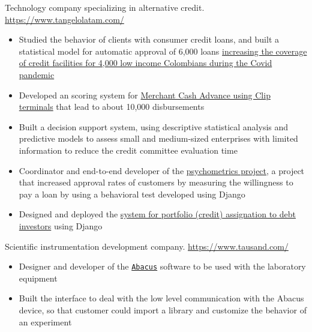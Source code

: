 \documentclass[11pt, letterpaper, sans]{moderncv}
\begin{document}
    {
        Technology company specializing in alternative credit. \url{https://www.tangelolatam.com/}
        \vspace{3pt}
        \begin{itemize}
            \item Studied the behavior of clients with consumer credit loans, and built a statistical model for automatic approval of 6,000 loans \href{https://forbes.co/2020/05/13/emprendedores/zinobe-obtiene-us30-millones-en-financiacion-para-otorgar-mas-creditos-digitales}{\color{color1} increasing the coverage of credit facilities for 4,000 low income Colombians during the Covid pandemic}
            \item Developed an scoring system for \href{https://tekiosmag.com/2022/03/31/fintech-tangelo-anuncia-alianza-con-el-unicornio-mexicano-clip-y-dell-leasing/}{\color{color1} Merchant Cash Advance using Clip terminals} that lead to about 10,000 disbursements 
            \item Built a decision support system, using descriptive statistical analysis and predictive models to assess small and medium-sized enterprises with limited information to reduce the credit committee evaluation time
            \item Coordinator and end-to-end developer of the \href{https://psychometrics.zinobe.com/v1/}{\color{color1} psychometrics project}, a project that increased approval rates of customers by measuring the willingness to pay a loan by using a behavioral test developed using {\color{color3} Django}
            \item Designed and deployed the \href{https://contxto.com/es/fondeo/fintech-zinobe-levanta-inversion-monachil-capital-partners/}{\color{color1} system for portfolio (credit) assignation to debt investors} using {\color{color3} Django}
        \end{itemize}
    }

    {
        Scientific instrumentation development company. \url{https://www.tausand.com/}
        \vspace{3pt}
        \begin{itemize}
            \item Designer and developer of the  \href{https://www.tausand.com/downloads/}{\color{color1} \texttt{Abacus}} software to be used with the laboratory equipment
            \item Built the interface to deal with the low level communication with the Abacus device, so that customer could import a library and customize the behavior of an experiment 
        \end{itemize}
    }
\end{document}
